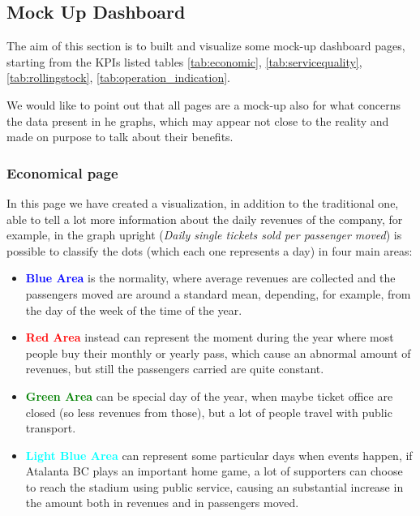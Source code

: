 
\newpage




\subsection{Mock Up Dashboard}
The aim of this section is to built and visualize some mock-up dashboard pages, starting from the KPIs listed tables \ref{tab:economic}, \ref{tab:servicequality}, \ref{tab:rollingstock}, \ref{tab:operation_indication}.

We would like to point out that all pages are a mock-up also for what concerns the data present in he graphs, which may appear not close to the reality and made on purpose to talk about their benefits.

\newpage

\newpage
\begin{landscape}
\thispagestyle{empty}

\end{landscape}


\subsubsection{Economical page}
In this page we have created a visualization, in addition to the traditional one, able to tell a lot more information about the daily revenues of the company, for example, in the graph upright (\emph{Daily single tickets sold per passenger moved}) is possible to classify the dots (which each one represents a day) in four main areas:

\begin{itemize}
    \item \textcolor{blue}{\textbf{Blue Area}} is the normality, where average revenues are collected and the passengers moved are around a standard mean, depending, for example, from the day of the week of the time of the year.
    \item \textcolor{red}{\textbf{Red Area}} instead can represent the moment during the year where most people buy their monthly or yearly pass, which cause an abnormal amount of revenues, but still the passengers carried are quite constant.
    \item \textcolor{green}{\textbf{Green Area}} can be special day of the year, when maybe ticket office are closed (so less revenues from those), but a lot of people travel with public transport.
    \item \textcolor{cyan}{\textbf{Light Blue Area}} can represent some particular days when events happen, if Atalanta BC plays an important home game, a lot of supporters can choose to reach the stadium using public service, causing an substantial increase in the amount both in revenues and in passengers moved.
\end{itemize}


